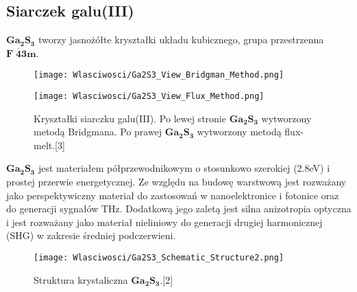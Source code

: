 \subsection{Siarczek galu(III)}
$\mathbf{Ga_{2}S_{3}}$ tworzy jasnożółte kryształki układu kubicznego, grupa przestrzenna
$\mathbf{F\;\overline{4}3m}$.
\begin{figure}[H]
	\begin{center}
		\begin{minipage}[h]{0.3\linewidth}
			\texttt{[image: Wlasciwosci/Ga2S3\_View\_Bridgman\_Method.png]}
		\end{minipage}
		\begin{minipage}[h]{0.3\linewidth}
			\texttt{[image: Wlasciwosci/Ga2S3\_View\_Flux\_Method.png]}
		\end{minipage}
		\caption{Kryształki siarczku galu(III). Po lewej stronie $\mathbf{Ga_{2}S_{3}}$ wytworzony metodą Bridgmana. Po prawej $\mathbf{Ga_{2}S_{3}}$ wytworzony metodą flux-melt.[3]}
	\end{center}
\end{figure}
$\mathbf{Ga_{2}S_{3}}$ jest materiałem półprzewodnikowym o stosunkowo szerokiej (2.8eV) i prostej przerwie energetycznej. Ze względu na budowę warstwową jest rozważany jako perspektywiczny materiał do zastosowań w nanoelektronice i fotonice oraz do generacji sygnałów THz. Dodatkową jego zaletą jest silna anizotropia optyczna i jest rozważany jako materiał nieliniowy do generacji drugiej harmonicznej (SHG) w zakresie średniej podczerwieni.
\begin{figure}[H]
	\begin{center}
		\texttt{[image: Wlasciwosci/Ga2S3\_Schematic\_Structure2.png]}
		\caption{Struktura krystaliczna $\mathbf{Ga_{2}S_{3}}$.[2]}
	\end{center}
\end{figure}



